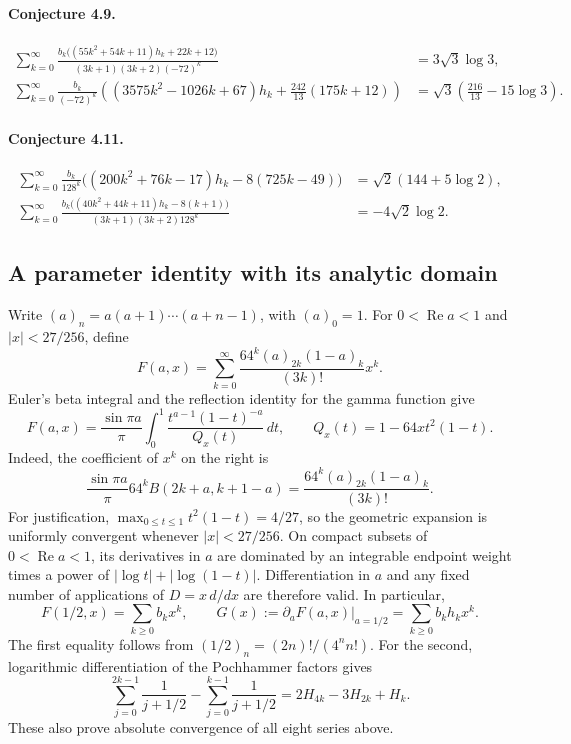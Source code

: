 \documentclass[11pt,a4paper]{article}
\theoremstyle{remark}\newtheorem{remark}[theorem]{Remark}
\numberwithin{equation}{section}
\begin{document}
\paragraph{Conjecture 4.9.}
\begin{align}
 \sum_{k=0}^{\infty}
 \frac{b_k\bigl((55k^2+54k+11)h_k+22k+12\bigr)}
 {(3k+1)(3k+2)(-72)^k}
 &=3\sqrt3\log3, \label{eq:beta-sun413}\\
 \sum_{k=0}^{\infty}\frac{b_k}{(-72)^k}
 \left((3575k^2-1026k+67)h_k+
 \frac{242}{13}(175k+12)\right)
 &=\sqrt3\left(\frac{216}{13}-15\log3\right).
 \label{eq:beta-sun414}
\end{align}
\paragraph{Conjecture 4.11.}
\begin{align}
 \sum_{k=0}^{\infty}\frac{b_k}{128^k}
 \bigl((200k^2+76k-17)h_k-8(725k-49)\bigr)
 &=\sqrt2(144+5\log2), \label{eq:beta-sun415}\\
 \sum_{k=0}^{\infty}
 \frac{b_k\bigl((40k^2+44k+11)h_k-8(k+1)\bigr)}
 {(3k+1)(3k+2)128^k}
 &=-4\sqrt2\log2. \label{eq:beta-sun416}
\end{align}

\subsection{A parameter identity with its analytic domain}
Write $(a)_n=a(a+1)\cdots(a+n-1)$, with $(a)_0=1$. For
$0<\operatorname{Re}a<1$ and $|x|<27/256$, define
\begin{equation}
 F(a,x)=\sum_{k=0}^{\infty}
 \frac{64^k(a)_{2k}(1-a)_k}{(3k)!}x^k.
 \label{eq:beta-F}
\end{equation}
Euler's beta integral and the reflection identity for the gamma function give
\begin{equation}
 F(a,x)=\frac{\sin\pi a}{\pi}\int_0^1
 \frac{t^{a-1}(1-t)^{-a}}{Q_x(t)}\,dt,
 \qquad Q_x(t)=1-64xt^2(1-t).
 \label{eq:beta-euler}
\end{equation}
Indeed, the coefficient of $x^k$ on the right is
\[
 \frac{\sin\pi a}{\pi}64^k B(2k+a,k+1-a)
 =\frac{64^k(a)_{2k}(1-a)_k}{(3k)!}.
\]
For justification, $\max_{0\le t\le1}t^2(1-t)=4/27$, so the
geometric expansion is uniformly convergent whenever $|x|<27/256$.
On compact subsets of $0<\operatorname{Re}a<1$, its derivatives in $a$
are dominated by an integrable endpoint weight times a power of
$|\log t|+|\log(1-t)|$. Differentiation in $a$ and any fixed number of
applications of $D=x\,d/dx$ are therefore valid. In particular,
\begin{equation}
 F(1/2,x)=\sum_{k\ge0}b_kx^k,
 \qquad G(x):=\left.\partial_aF(a,x)\right|_{a=1/2}
 =\sum_{k\ge0}b_kh_kx^k.
 \label{eq:beta-G}
\end{equation}
The first equality follows from
$(1/2)_n=(2n)!/(4^n n!)$. For the second, logarithmic differentiation
of the Pochhammer factors gives
\[
 \sum_{j=0}^{2k-1}\frac1{j+1/2}-
 \sum_{j=0}^{k-1}\frac1{j+1/2}
 =2H_{4k}-3H_{2k}+H_k.
\]
These also prove absolute convergence of all eight series above.
\end{document}
